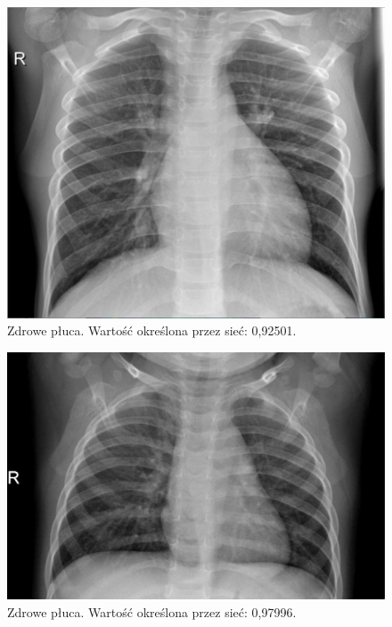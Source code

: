 \documentclass[12pt,a4paper,twoside,titlepage,openright]{book}
\begin{document}
\begin{itemize}
\begin{itemize}
\begin{figure}[ht]
	\centering
			\includegraphics[resolution=100, scale=0.3]{randomIncorrect1.png}
		\caption{Zdrowe płuca. Wartość określona przez sieć: 0,92501.}
				\label{fig:randomIncorrect1}
\end{figure}

\begin{figure}[ht]
	\centering
			\includegraphics[resolution=100, scale=0.3]{randomIncorrect2.png}
		\caption{Zdrowe płuca. Wartość określona przez sieć: 0,97996.}
				\label{fig:randomIncorrect2}
\end{figure}


\end{itemize}
\end{itemize}
\end{document}
